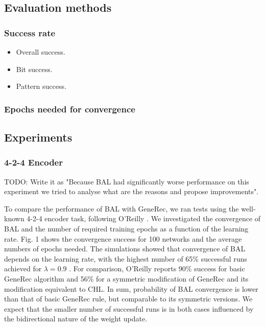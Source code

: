 \subsection{Evaluation methods} 

\subsubsection{Success rate} 

\begin{itemize}
\item Overall success. 
\item Bit success. 
\item Pattern success. 
\end{itemize} 

\subsubsection{Epochs needed for convergence} 



\subsection{Experiments}  

\subsubsection{4-2-4 Encoder} 

TODO: Write it as "Because BAL had significantly worse performance on this experiment we tried to analyse what are the reasons and propose improvements". 

To compare the performance of BAL with GeneRec, we ran tests using the well-
known 4-2-4 encoder task, following O’Reilly \cite{o1996bio}. We investigated the convergence
of BAL and the number of required training epochs as a function of the learning
rate. Fig. 1 shows the convergence success for 100 networks and the average
numbers of epochs needed. The simulations showed that convergence of BAL
depends on the learning rate, with the highest number of 65\% successful runs
achieved for $\lambda = 0.9$ \cite{farkas2013bal}. For comparison, O’Reilly \cite{o1996bio} reports 90\% success for basic GeneRec algorithm and 56\% for a symmetric modification of GeneRec and its
modification equivalent to CHL. In sum, probability of BAL convergence is lower
than that of basic GeneRec rule, but comparable to its symmetric versions. We
expect that the smaller number of successful runs is in both cases influenced by
the bidirectional nature of the weight update.

